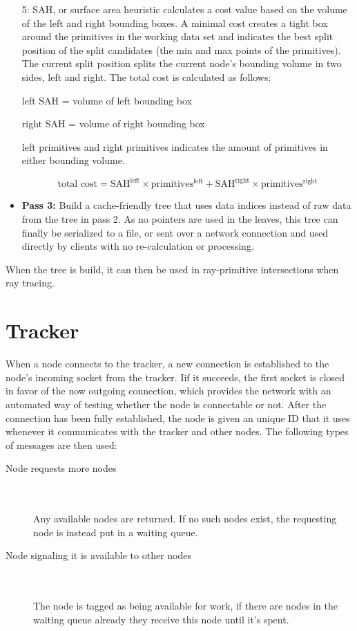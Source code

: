\begin{itemize}
  5: SAH, or surface area heuristic calculates a cost value based on the volume of the left and right bounding boxes. A minimal cost creates a tight box around the primitives in the working data set and indicates the best split position of the split candidates (the min and max points of the primitives). The current split position splits the current node's bounding volume in two sides, left and right. The total cost is calculated as follows: 

  left SAH = volume of left bounding box

  right SAH = volume of right bounding box

  left primitives and right primitives indicates the amount of primitives in either bounding volume.

  \begin{equation}
  	\text{total cost} = \text{SAH}^{\text{left}} \times \text{primitives}^{\text{left}} + \text{SAH}^{\text{right}} \times \text{primitives}^{\text{right}}
  \end{equation}

  \item \textbf{Pass 3:} Build a cache-friendly tree that uses data indices instead of raw data from the tree in pass 2. As no pointers are used in the leaves, this tree can finally be serialized to a file, or sent over a network connection and used directly by clients with no re-calculation or processing.
\end{itemize}

When the tree is build, it can then be used in ray-primitive intersections when ray tracing.

\section{Tracker}
When a node connects to the tracker, a new connection is established to the node's incoming socket from the tracker. Iif it succeeds, the first socket is closed in favor of the now outgoing connection, which provides the network with an automated way of testing whether the node is connectable or not. After the connection has been fully established, the node is given an unique ID that it uses whenever it communicates with the tracker and other nodes.
The following types of messages are then used:

\begin{description}
\item[Node requests more nodes] \hfill \\\\
Any available nodes are returned. If no such nodes exist, the requesting node is instead put in a waiting queue.
\item[Node signaling it is available to other nodes] \hfill \\\\
The node is tagged as being available for work, if there are nodes in the waiting queue already they receive this node until it's spent.
\end{description}

